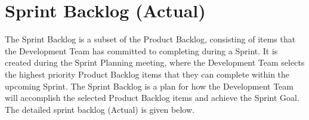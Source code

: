 \documentclass[12pt]{report}
\begin{document}
\section{Sprint Backlog (Actual)}
The Sprint Backlog is a subset of the Product Backlog, consisting of items that the Development Team has committed to completing during a Sprint. It is created during the Sprint Planning meeting, where the Development Team selects the highest priority Product Backlog items that they can complete within the upcoming Sprint. The Sprint Backlog is a plan for how the Development Team will accomplish the selected Product Backlog items and achieve the Sprint Goal. The detailed sprint backlog (Actual) is given below.
\begin{table}[htbp]
\LARGE
{}
\end{table}
\end{document}
